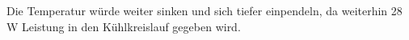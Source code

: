 Die Temperatur würde weiter sinken und sich tiefer einpendeln, da weiterhin 28 W Leistung in den Kühlkreislauf gegeben wird.
